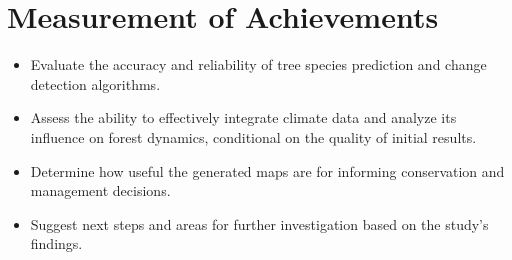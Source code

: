 \section{Measurement of Achievements}

\begin{itemize}
\item Evaluate the accuracy and reliability of tree species prediction and change detection algorithms.
\item Assess the ability to effectively integrate climate data and analyze its influence on forest dynamics, conditional on the quality of initial results.
\item Determine how useful the generated maps are for informing conservation and management decisions.
\item Suggest next steps and areas for further investigation based on the study's findings.
\end{itemize}

